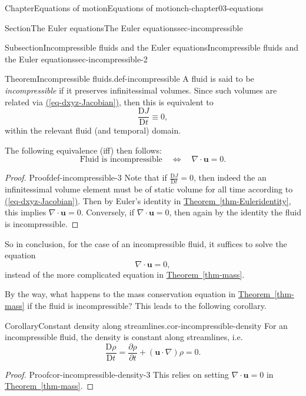 \documentclass[oneside,10pt,]{book}
\newcommand{\xreffont}{\relax}
\numberwithin{equation}{section}
\newcommand{\DD}[2]{\frac{\mathrm{D}#1}{\mathrm{D}#2}}
\newcommand{\pd}[2]{\frac{\partial#1}{\partial#2}}
\newcommand{\bu}{\boldsymbol{u}}
\begin{document}
\begin{chapterptx}{Chapter}{Equations of motion}{}{Equations of motion}{}{}{ch-chapter03-equations}
\begin{sectionptx}{Section}{The Euler equations}{}{The Euler equations}{}{}{sec-incompressible}
\begin{subsectionptx}{Subsection}{Incompressible fluids and the Euler equations}{}{Incompressible fluids and the Euler equations}{}{}{sec-incompressible-2}
\begin{theorem}{Theorem}{Incompressible fluids.}{}{def-incompressible}%
A fluid is said to be \emph{incompressible} if it preserves infinitessimal volumes. Since such volumes are related via \hyperref[eq-dxyz-Jacobian]{({\xreffont\ref{eq-dxyz-Jacobian}})}, then this is equivalent to%
\begin{equation*}
\DD{J}{t} \equiv 0,
\end{equation*}
within the relevant fluid (and temporal) domain.%
\par
The following equivalence (iff) then follows:%
\begin{equation}
\textrm{Fluid is incompressible} \quad \Longleftrightarrow \quad \nabla \cdot \bu = 0.\label{eqn-incompressibledef}
\end{equation}
%
\end{theorem}
\begin{proof}{Proof}{}{def-incompressible-3}
Note that if \(\DD{J}{t} = 0\), then indeed the an infinitessimal volume element must be of static volume for all time according to \hyperref[eq-dxyz-Jacobian]{({\xreffont\ref{eq-dxyz-Jacobian}})}. Then by Euler's identity in \hyperref[thm-Euleridentity]{Theorem~{\xreffont\ref{thm-Euleridentity}}}, this implies \(\nabla \cdot \bu = 0.\) Conversely, if \(\nabla \cdot \bu = 0\), then again by the identity the fluid is incompressible.%
\end{proof}
So in conclusion, for the case of an incompressible fluid, it suffices to solve the equation%
\begin{equation}
\nabla \cdot \bu = 0,\label{eqn-divu}
\end{equation}
instead of the more complicated equation in \hyperref[thm-mass]{Theorem~{\xreffont\ref{thm-mass}}}.%
\par
By the way, what happens to the mass conservation equation in \hyperref[thm-mass]{Theorem~{\xreffont\ref{thm-mass}}} if the fluid is incompressible? This leads to the following corollary.%
\begin{corollary}{Corollary}{Constant density along streamlines.}{}{cor-incompressible-density}%
For an incompressible fluid, the density is constant along streamlines, i.e.%
\begin{equation*}
\DD{\rho}{t} = \pd{\rho}{t} + (\bu \cdot \nabla)\rho = 0.
\end{equation*}
%
\end{corollary}
\begin{proof}{Proof}{}{cor-incompressible-density-3}
This relies on setting \(\nabla \cdot \bu = 0\) in \hyperref[thm-mass]{Theorem~{\xreffont\ref{thm-mass}}}.%

\end{proof}
\end{subsectionptx}
\end{sectionptx}
\end{chapterptx}
\end{document}
